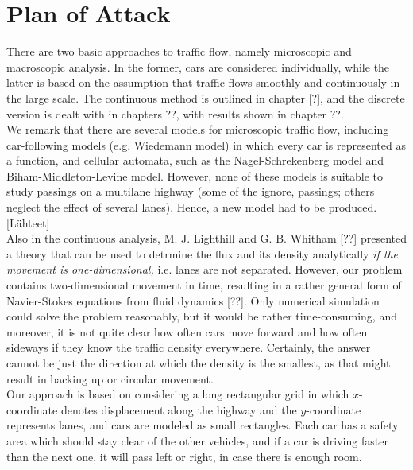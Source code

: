 \documentclass[12pt]{article}
\begin{document}
\section{Plan of Attack}

There are two basic approaches to traffic flow, namely microscopic and macroscopic analysis. In the former, cars are considered individually, while the latter is based on the assumption that traffic flows smoothly and continuously in the large scale. The continuous method is  outlined in chapter [?], and the discrete version is dealt with in chapters ??, with results shown in chapter ??.\\


We remark that there are several models for microscopic traffic flow, including car-following models (e.g. Wiedemann model) in which every car is represented as a function, and cellular automata, such as the Nagel-Schrekenberg model and Biham-Middleton-Levine model. However, none of these models is suitable to study passings on a multilane highway (some of the ignore, passings; others neglect the effect of several lanes). Hence, a new model had to be produced.
[Lähteet]\\

Also in the continuous analysis, M. J. Lighthill and G. B. Whitham [??] presented a theory that can be used to detrmine the flux and its density analytically \textit{if the movement is one-dimensional,} i.e. lanes are not separated. However, our problem contains two-dimensional movement in time, resulting in a rather general form of Navier-Stokes equations from fluid dynamics [??]. Only numerical simulation could solve the problem reasonably, but it would be rather time-consuming, and moreover, it is not quite clear how often cars move forward and how often sideways if they know the traffic density everywhere. 
Certainly, the answer cannot be just the direction at which the density is the smallest, as that might result in backing up or circular movement.\\ %



Our approach is based on considering a long  rectangular grid in which $x$-coordinate denotes displacement along the highway and the $y$-coordinate represents lanes, and cars are modeled as small rectangles. Each car has a safety area which should stay clear of the other vehicles, and if a car is driving faster than the next one, it will pass left or right, in case there is enough room.\\
\end{document}
